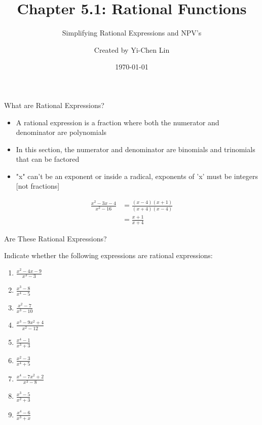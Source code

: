 \documentclass[aspectratio=169]{beamer}
\title{Chapter 5.1: Rational Functions}
\subtitle{Simplifying Rational Expressions and NPV's}
\author{Created by Yi-Chen Lin}
\date{\today}
\begin{document}
\begin{frame}
\titlepage
\end{frame}

\begin{frame}{What are Rational Expressions?}
\begin{tcolorbox}[colback=lightgray,colframe=primary,title=Definition]
\footnotesize
\begin{itemize}
  \item A rational expression is a fraction where both the numerator and denominator are polynomials
  \item In this section, the numerator and denominator are binomials and trinomials that can be factored
  \item "x" can't be an exponent or inside a radical, exponents of 'x' must be integers [not fractions]
\end{itemize}
\end{tcolorbox}

\begin{tcolorbox}[colback=lightgray,colframe=secondary,title=Example]
\footnotesize
\begin{align*}
\frac{x^2 - 3x - 4}{x^2 - 16} &= \frac{(x-4)(x+1)}{(x+4)(x-4)} \\
&= \frac{x+1}{x+4}
\end{align*}
\end{tcolorbox}
\end{frame}

\begin{frame}{Are These Rational Expressions?}
\begin{tcolorbox}[colback=lightgray,colframe=primary,title=Practice]
\footnotesize
Indicate whether the following expressions are rational expressions:
\begin{enumerate}
  \item $\frac{x^2 - 4x - 9}{x^3 - 3}$
  \item $\frac{x^3 - 8}{x^4 - 5}$
  \item $\frac{x^2 - 7}{x^3 - 10}$
  \item $\frac{x^3 - 9x^2 + 4}{x^2 - 12}$
  \item $\frac{x^4 - 1}{x^3 + 3}$
  \item $\frac{x^2 - 3}{x^4 + 5}$
  \item $\frac{x^4 - 7x^2 + 2}{x^3 - 8}$
  \item $\frac{x^3 - 5}{x^2 + 3}$
  \item $\frac{x^4 - 6}{x^3 + x}$
\end{enumerate}
\end{tcolorbox}
\end{frame}
\end{document}
